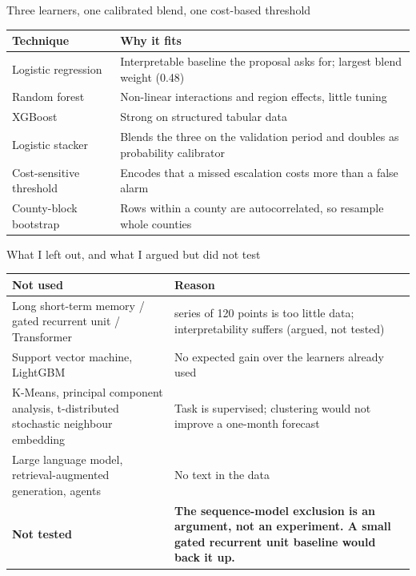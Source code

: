 \documentclass[aspectratio=169,11pt]{beamer}
\begin{document}
\begin{frame}{Three learners, one calibrated blend, one cost-based threshold}
  \small
  \begin{tabular}{@{}>{\raggedright\arraybackslash}p{3.6cm}>{\raggedright\arraybackslash}p{9.6cm}@{}}
    \toprule \textbf{Technique} & \textbf{Why it fits} \\ \midrule
    Logistic regression & Interpretable baseline the proposal asks for; largest blend weight (0.48) \\
    Random forest & Non-linear interactions and region effects, little tuning \\
    XGBoost & Strong on structured tabular data \\
    Logistic stacker & Blends the three on the validation period and doubles as probability calibrator \\
    Cost-sensitive threshold & Encodes that a missed escalation costs more than a false alarm \\
    County-block bootstrap & Rows within a county are autocorrelated, so resample whole counties \\
    \bottomrule
  \end{tabular}
\end{frame}

\begin{frame}{What I left out, and what I argued but did not test}
  \footnotesize
  \begin{tabular}{@{}>{\raggedright\arraybackslash}p{4.2cm}>{\raggedright\arraybackslash}p{9.0cm}@{}}
    \toprule \textbf{Not used} & \textbf{Reason} \\ \midrule
    Long short-term memory / gated recurrent unit / Transformer & 47 series of 120 points is too little data; interpretability suffers (argued, not tested) \\
    Support vector machine, LightGBM & No expected gain over the learners already used \\
    K-Means, principal component analysis, t-distributed stochastic neighbour embedding & Task is supervised; clustering would not improve a one-month forecast \\
    Large language model, retrieval-augmented generation, agents & No text in the data \\
    \midrule
    \textbf{Not tested} & \textbf{The sequence-model exclusion is an argument, not an experiment. A small gated recurrent unit baseline would back it up.} \\
    \bottomrule
  \end{tabular}
\end{frame}
\end{document}
